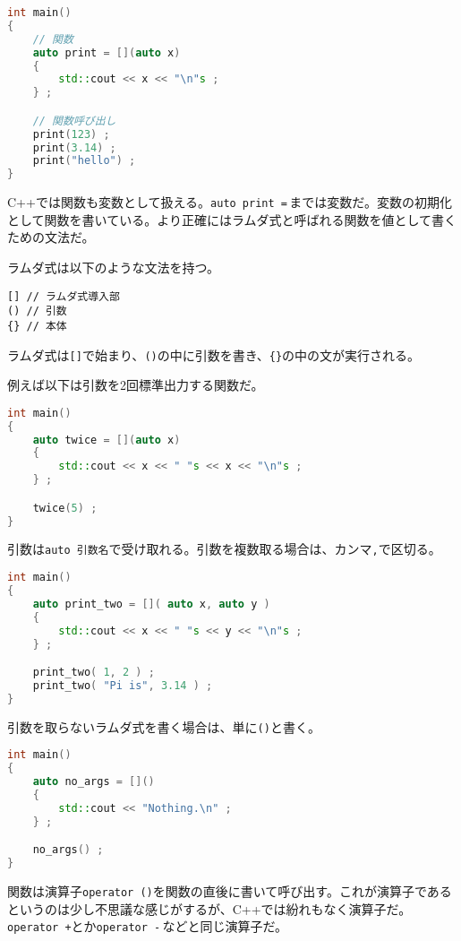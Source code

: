 \begin{lstlisting}[language={C++}]
int main()
{
    // 関数
    auto print = [](auto x)
    {
        std::cout << x << "\n"s ;
    } ;

    // 関数呼び出し
    print(123) ;
    print(3.14) ;
    print("hello") ;
}
\end{lstlisting}

C++では関数も変数として扱える。\texttt{auto print =}\,までは変数だ。変数の初期化として関数を書いている。より正確にはラムダ式と呼ばれる関数を値として書くための文法だ。

ラムダ式は以下のような文法を持つ。

\begin{lstlisting}[style=grammar]
[] // ラムダ式導入部
() // 引数
{} // 本体
\end{lstlisting}

ラムダ式は\texttt{[]}で始まり、\texttt{()}の中に引数を書き、\texttt{\{\}}の中の文が実行される。

例えば以下は引数を2回標準出力する関数だ。

\begin{lstlisting}[language={C++}]
int main()
{
    auto twice = [](auto x)
    {
        std::cout << x << " "s << x << "\n"s ;
    } ;

    twice(5) ;
}
\end{lstlisting}

引数は\texttt{auto 引数名}で受け取れる。引数を複数取る場合は、カンマ\texttt{,}で区切る。

\begin{lstlisting}[language={C++}]
int main()
{
    auto print_two = []( auto x, auto y )
    {
        std::cout << x << " "s << y << "\n"s ;
    } ;

    print_two( 1, 2 ) ;
    print_two( "Pi is", 3.14 ) ;
}
\end{lstlisting}

引数を取らないラムダ式を書く場合は、単に\texttt{()}と書く。

\begin{lstlisting}[language={C++}]
int main()
{
    auto no_args = []()
    {
        std::cout << "Nothing.\n" ;
    } ;

    no_args() ;
}
\end{lstlisting}

関数は演算子\texttt{operator ()}を関数の直後に書いて呼び出す。これが演算子であるというのは少し不思議な感じがするが、C++では紛れもなく演算子だ。\texttt{operator +}とか\texttt{operator -}\,などと同じ演算子だ。

